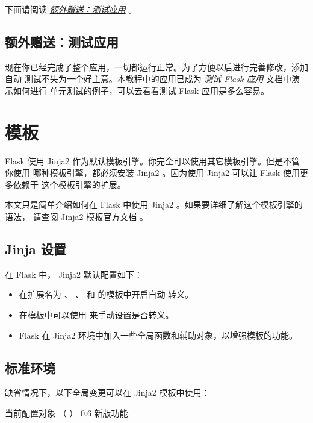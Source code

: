 \documentclass[a4paper,12pt]{sphinxmanual}
\begin{document}
下面请阅读 {\hyperref[tutorial/testing:tutorial-testing]{\emph{额外赠送：测试应用}}} 。


\section{额外赠送：测试应用}
\label{tutorial/testing:tutorial-testing}\label{tutorial/testing::doc}\label{tutorial/testing:id1}
现在你已经完成了整个应用，一切都运行正常。为了方便以后进行完善修改，添加自动
测试不失为一个好主意。本教程中的应用已成为 {\hyperref[testing:testing]{\emph{测试 Flask 应用}}} 文档中演示如何进行
单元测试的例子，可以去看看测试 Flask 应用是多么容易。


\chapter{模板}
\label{templating::doc}\label{templating:id1}
Flask 使用 Jinja2 作为默认模板引擎。你完全可以使用其它模板引擎。但是不管你使用
哪种模板引擎，都必须安装 Jinja2 。因为使用 Jinja2 可以让 Flask 使用更多依赖于
这个模板引擎的扩展。

本文只是简单介绍如何在 Flask 中使用 Jinja2 。如果要详细了解这个模板引擎的语法，
请查阅 \href{http://jinja.pocoo.org/2/documentation/templates}{Jinja2 模板官方文档} 。


\section{Jinja 设置}
\label{templating:jinja}
在 Flask 中， Jinja2 默认配置如下：
\begin{itemize}
\item {} 
在扩展名为  、  、  和  的模板中开启自动
转义。

\item {} 
在模板中可以使用  来手动设置是否转义。

\item {} 
Flask 在 Jinja2 环境中加入一些全局函数和辅助对象，以增强模板的功能。

\end{itemize}


\section{标准环境}
\label{templating:id2}
缺省情况下，以下全局变更可以在 Jinja2 模板中使用：


\begin{fulllineitems}
当前配置对象 （  ）
0.6 新版功能.
\end{fulllineitems}
\end{document}
